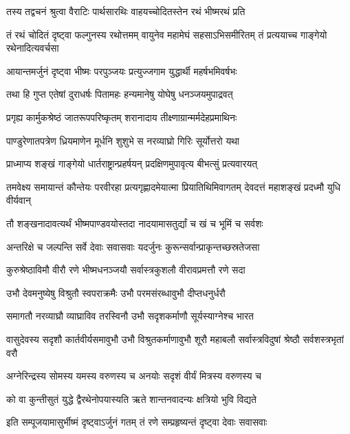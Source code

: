 
\twolineshloka
{तस्य तद्वचनं श्रुत्वा वैराटिः पार्थसारथिः}
{वाहयच्चोदितस्तेन रथं भीष्मरथं प्रति}


\threelineshloka
{तं रथं चोदितं दृष्ट्वा फल्गुनस्य रथोत्तमम्}
{वायुनेव महामेघं सहसाऽभिसमीरितम्}
{तं प्रत्ययाच्च गाङ्गेयो रथेनादित्यवर्चसा}


\twolineshloka
{आयान्तमर्जुनं दृष्ट्वा भीष्मः परपुञ्जयः}
{प्रत्युज्जगाम युद्धार्थी महर्षभमिवर्षभः}


\twolineshloka
{तथा हि गुप्त एतेषां दुराधर्षः पितामहः}
{हन्यमानेषु योघेषु धनञ्जयमुपाद्रवत्}


\twolineshloka
{प्रगृह्य कार्मुकश्रेष्ठं जातरूपपरिष्कृतम्}
{शरानादाय तीक्ष्णाग्रान्मर्मदेहप्रमाथिनः}


\twolineshloka
{पाण्डुरेणातपत्रेण ध्रियमाणेन मूर्धनि}
{शुशुभे स नरव्याघ्रो गिरिः सूर्योत्तरो यथा}


\twolineshloka
{प्राध्माप्य शङ्खं गाङ्गेयो धार्तराष्ट्रान्प्रहर्षयन्}
{प्रदक्षिणमुपावृत्य बीभत्सुं प्रत्यवारयत्}


\threelineshloka
{तमवेक्ष्य समायान्तं कौन्तेयः परवीरहा}
{प्रत्यगृह्णादमेयात्मा प्रियातिथिमिवागतम्}
{देवदत्तं महाशङ्खं प्रदध्मौ युधि वीर्यवान्}


\twolineshloka
{तौ शङ्खनादावत्यर्थं भीष्मपाण्डवयोस्तदा}
{नादयामासतुर्द्यां च खं च भूमिं च सर्वशः}


\twolineshloka
{अन्तरिक्षे च जल्पन्ति सर्वे देवाः सवासवाः}
{यदर्जुनः कुरून्सर्वान्प्राकृन्तच्छस्रतेजसा}


\twolineshloka
{कुरुश्रेष्ठाविमौ वीरौ रणे भीष्मधनञ्जयौ}
{सर्वास्त्रकुशलौ वीरावप्रमत्तौ रणे सदा}


\twolineshloka
{उभौ देवमनुष्येषु विश्रुतौ स्वपराक्रमैः}
{उभौ परमसंरब्धावुभौ दीप्तधनुर्धरौ}


\twolineshloka
{समागतौ नरव्याघ्रौ व्याघ्राविव तरस्विनौ}
{उभौ सदृशकर्माणौ सूर्यस्याग्नेश्च भारत}


\threelineshloka
{वासुदेवस्य सदृशौ कार्तवीर्यसमावुभौ}
{उभौ विश्रुतकर्माणावुभौ शूरौ महाबलौ}
{सर्वास्त्रविदुषां श्रेष्ठौ सर्वशस्त्रभृतां वरौ}


\twolineshloka
{अग्नेरिन्द्रस्य सोमस्य यमस्य वरुणस्य च}
{अनयोः सदृशं वीर्यं मित्रस्य वरुणस्य च}


\twolineshloka
{को वा कुन्तीसुतं युद्धे द्वैरथेनोपयास्यति}
{ऋते शान्तनवादन्यः क्षत्रियो भुवि विद्यते}


\twolineshloka
{इति सम्पूजयामासुर्भीष्मं दृष्ट्वाऽर्जुनं गतम्}
{तं रणे सम्प्रहृष्यन्तं दृष्ट्वा देवाः सवासवाः}



